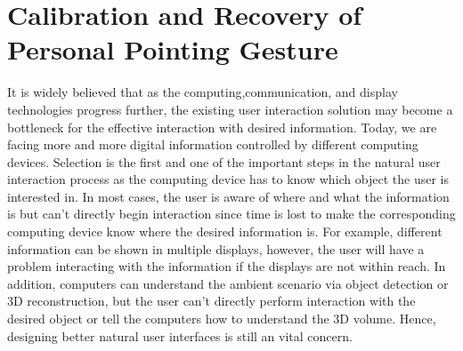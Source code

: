 %
\chapter{Calibration and Recovery of Personal Pointing Gesture}
\label{chap:3-PAST}
It is widely believed that as the computing,communication, and display technologies progress further, the existing user interaction solution may become a bottleneck for the effective interaction with desired information. 
Today, we are facing more and more digital information controlled by different computing devices.
Selection is the first and one of the important steps in the natural user interaction process as the computing device has to know which object the user is interested in. In most cases, the user is aware of where and what the information is but can't directly begin interaction since time is lost to make the corresponding computing device know where the desired information is\cite{Swindells2002}. 
For example, different information can be shown in multiple displays, however, the user will have a problem interacting with the information if the displays are not within reach. In addition, computers can understand the ambient scenario via object detection or 3D reconstruction, but the user can't directly perform interaction with the desired object or tell the computers how to understand the 3D volume\cite{export:244725}.
Hence, designing better natural user interfaces is still an vital concern.


